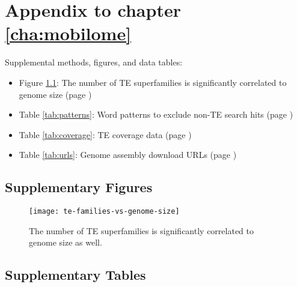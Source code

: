 \chapter{Appendix to chapter \ref{cha:mobilome}}

Supplemental methods, figures, and data tables:

\begin{itemize}
	\item Figure \ref{fig:te-families-vs-genome-size}: The number of TE superfamilies is significantly correlated to genome size (page \pageref{fig:te-families-vs-genome-size})
\end{itemize}

\begin{itemize}
	\item Table \ref{tab:patterns}: Word patterns to exclude non-TE search hits (page \pageref{tab:patterns})
	\item Table \ref{tab:coverage}: TE coverage data (page \pageref{tab:coverage})
	\item Table \ref{tab:urls}: Genome assembly download URLs (page \pageref{tab:urls})
\end{itemize}

\section{Supplementary Figures}

\begin{figure}[h]
\centering
\texttt{[image: te-families-vs-genome-size]}
\caption[The number of TE superfamilies is significantly correlated to
genome size]{The number of TE superfamilies is significantly correlated to
genome size as well.}
\label{fig:te-families-vs-genome-size}
\end{figure}


\clearpage

\section{Supplementary Tables}

